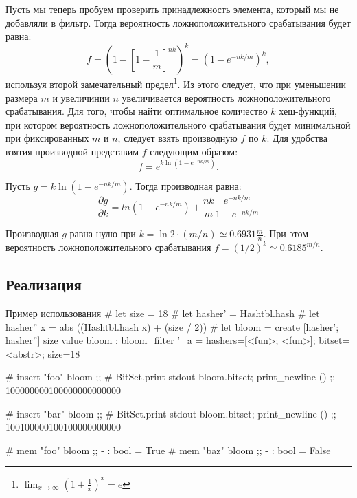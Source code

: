 Пусть мы теперь пробуем проверить принадлежность элемента, который мы не добавляли в фильтр. Тогда вероятность ложноположительного срабатывания будет равна:
\[
f= \left( 1 - \left[ 1 - \frac{1}{m} \right]^{nk} \right)^k =  \left( 1 - e^{-nk / m} \right)^k,
\]
используя второй замечательный предел\footnote{$\lim_{x \to \infty} \left( 1 + \frac{1}{x} \right)^x = e$}. Из этого следует, что при уменьшении размера $m$ и увеличинии $n$ увеличивается вероятность ложноположительного срабатывания. Для того, чтобы найти оптимальное количество $k$ хеш-функций, при котором вероятность ложноположительного срабатывания будет минимальной при фиксированных $m$ и $n$, следует взять производную $f$ по $k$. Для удобства взятия производной представим $f$ следующим образом:
\[
f = e^{k\ln(1 - e^{-nk / m})}.
\]

Пусть $g = k\ln(1 - e^{-nk / m})$. Тогда производная равна:
\[
\frac{\partial g}{\partial k} = ln(1 - e^{-nk / m}) + \frac{nk}{m} \frac{e^{-nk / m}}{1 - e^{-nk / m}}
\]

Производная $g$ равна нулю при $k = \ln 2 \cdot (m / n) \simeq 0.6931 \frac{m}{n}$. При этом вероятность ложноположительного срабатывания $f = (1 / 2)^k \simeq 0.6185^{m / n}$.

\subsection{Реализация}


\begin{ocamllst}{Пример использования}{}
# let size = 18
# let hasher' = Hashtbl.hash
# let hasher'' x = abs ((Hashtbl.hash x) + (size / 2))
# let bloom = create [hasher'; hasher''] size
value bloom : bloom_filter '_a =
  {hashers=[<fun>; <fun>]; bitset=<abstr>; size=18}

# insert "foo" bloom ;;
# BitSet.print stdout bloom.bitset; print_newline () ;;
100000000100000000000000

# insert "bar" bloom ;;
# BitSet.print stdout bloom.bitset; print_newline () ;;
100100000100100000000000

# mem "foo" bloom ;;
- : bool = True
# mem "baz" bloom ;;
- : bool = False
\end{ocamllst}
